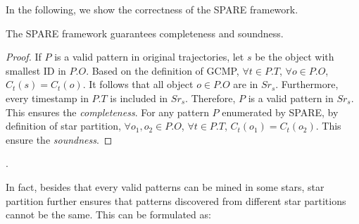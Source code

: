 

In the following, we show the correctness of the SPARE framework.
\begin{theorem}
\label{THM:SPM_CORRECT}
The SPARE framework guarantees completeness and soundness.
\end{theorem}
\begin{proof}
If $P$ is a valid pattern in original trajectories, 
let $s$ be the object with smallest ID in $P.O$. 
Based on the definition of GCMP, $\forall t \in P.T$, $\forall o \in P.O$, $C_t(s) = C_t(o)$.
It follows that all object $o \in P.O$ are in $Sr_s$. 
Furthermore, every timestamp in $P.T$ is included
in $Sr_s$. Therefore, $P$ is a valid pattern in $Sr_s$. This ensures the \emph{completeness}. For any pattern $P$ enumerated by SPARE, by definition of star partition, $\forall o_1, o_2 \in P.O$, $\forall t \in P.T$, $C_t(o_1) = C_t(o_2)$. This ensure the \emph{soundness}.
\end{proof}.

In fact, besides that every valid patterns can be
mined in some stars, star partition further ensures
that patterns discovered
from different star partitions cannot be the same. 
This can be formulated as:


